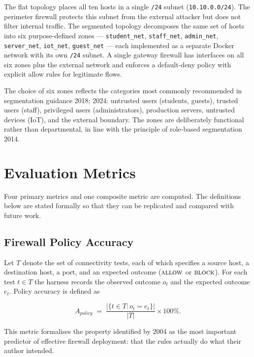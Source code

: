 The flat topology places all ten hosts in a single \texttt{/24} subnet (\texttt{10.10.0.0/24}). The perimeter firewall protects this subnet from the external attacker but does not filter internal traffic. The segmented topology decomposes the same set of hosts into six purpose-defined zones --- \texttt{student\_net}, \texttt{staff\_net}, \texttt{admin\_net}, \texttt{server\_net}, \texttt{iot\_net}, \texttt{guest\_net} --- each implemented as a separate Docker network with its own \texttt{/24} subnet. A single gateway firewall has interfaces on all six zones plus the external network and enforces a default-deny policy with explicit allow rules for legitimate flows.

The choice of six zones reflects the categories most commonly recommended in segmentation guidance \parencite{NCSC}{2018}; \parencite{CIS}{2024}: untrusted users (students, guests), trusted users (staff), privileged users (administrators), production servers, untrusted devices (IoT), and the external boundary. The zones are deliberately functional rather than departmental, in line with the principle of role-based segmentation \parencite{Hu et al.}{2014}.

\section{Evaluation Metrics}
\label{sec:metrics}

Four primary metrics and one composite metric are computed. The definitions below are stated formally so that they can be replicated and compared with future work.

\subsection{Firewall Policy Accuracy}

Let $T$ denote the set of connectivity tests, each of which specifies a source host, a destination host, a port, and an expected outcome ($\textsc{allow}$ or $\textsc{block}$). For each test $t \in T$ the harness records the observed outcome $o_t$ and the expected outcome $e_t$. Policy accuracy is defined as

\begin{equation}
A_{\textit{policy}} \;=\; \frac{|\{t \in T : o_t = e_t\}|}{|T|} \times 100\%.
\label{eq:accuracy}
\end{equation}

This metric formalises the property identified by \textcite{Wool}{2004} as the most important predictor of effective firewall deployment: that the rules actually do what their author intended.

